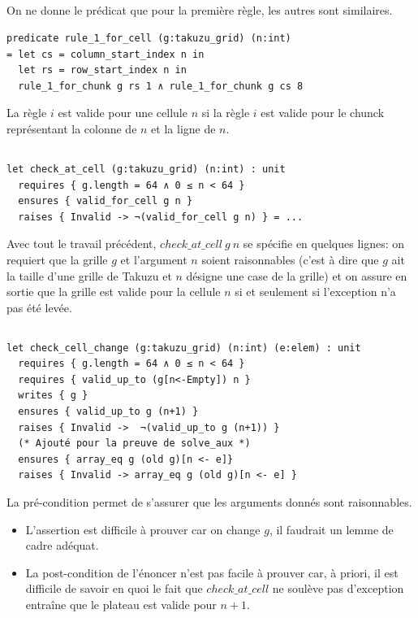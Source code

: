 ﻿\documentclass[10pt,a4paper]{article}
\begin{document}
\subsection{}
On ne donne le prédicat que pour la première règle, les autres sont similaires.
\begin{verbatim}
predicate rule_1_for_cell (g:takuzu_grid) (n:int)
= let cs = column_start_index n in
  let rs = row_start_index n in
  rule_1_for_chunk g rs 1 ∧ rule_1_for_chunk g cs 8
\end{verbatim}

La règle $i$ est valide pour une cellule $n$ si la règle $i$ est valide pour le chunck représentant la colonne de $n$ et la ligne de $n$.

\subsection{}
\begin{verbatim}
let check_at_cell (g:takuzu_grid) (n:int) : unit
  requires { g.length = 64 ∧ 0 ≤ n < 64 }
  ensures { valid_for_cell g n }
  raises { Invalid -> ¬(valid_for_cell g n) } = ...
\end{verbatim}

Avec tout le travail précédent, $check\_at\_cell\ g\ n$ se spécifie en quelques lignes: on requiert que la grille $g$ et l'argument $n$ soient raisonnables (c'est à dire que $g$ ait la taille d'une grille de Takuzu et $n$ désigne une case de la grille) et on assure en sortie que la grille est valide pour la cellule $n$ si et seulement si l'exception n'a pas été levée.

\subsection{}
\label{q18}
\begin{verbatim}
let check_cell_change (g:takuzu_grid) (n:int) (e:elem) : unit
  requires { g.length = 64 ∧ 0 ≤ n < 64 }
  requires { valid_up_to (g[n<-Empty]) n }
  writes { g }
  ensures { valid_up_to g (n+1) }
  raises { Invalid ->  ¬(valid_up_to g (n+1)) }
  (* Ajouté pour la preuve de solve_aux *)
  ensures { array_eq g (old g)[n <- e]}
  raises { Invalid -> array_eq g (old g)[n <- e] }
\end{verbatim}

La pré-condition permet de s'assurer que les arguments donnés sont raisonnables.

\begin{itemize}
\item L'assertion est difficile à prouver car on change $g$, il faudrait un lemme de cadre adéquat.
\item La post-condition de l'énoncer n'est pas facile à prouver car, à priori, il est difficile de savoir en quoi le fait que $check\_at\_cell$ ne soulève pas d'exception entraîne que le plateau est valide pour $n+1$.
\end{itemize}
\end{document}
